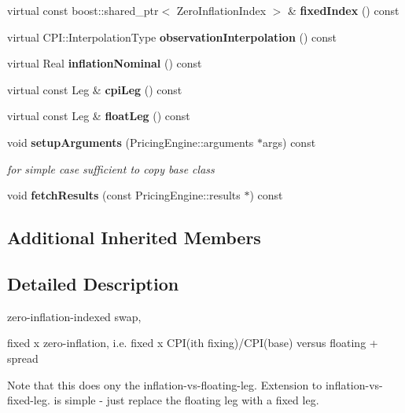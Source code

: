 \begin{DoxyCompactItemize}
\item 
virtual const boost\+::shared\+\_\+ptr$<$ Zero\+Inflation\+Index $>$ \& {\bfseries fixed\+Index} () const \label{class_quant_lib_1_1_c_p_i_swap_a18cbab644491d2a5b72d5044c98386e6}

\item 
virtual C\+P\+I\+::\+Interpolation\+Type {\bfseries observation\+Interpolation} () const \label{class_quant_lib_1_1_c_p_i_swap_afdc069ae77475b2dc6714b8dd766ec1b}

\item 
virtual Real {\bfseries inflation\+Nominal} () const \label{class_quant_lib_1_1_c_p_i_swap_ac9c3f4fbd8705c70612f2d0a5a535fa8}

\item 
virtual const Leg \& {\bfseries cpi\+Leg} () const \label{class_quant_lib_1_1_c_p_i_swap_a0bdee6997790a36874d6052082d7b796}

\item 
virtual const Leg \& {\bfseries float\+Leg} () const \label{class_quant_lib_1_1_c_p_i_swap_a16cc086eae31f64ecf520803409f9f1d}

\item 
void {\bf setup\+Arguments} (Pricing\+Engine\+::arguments $\ast$args) const \label{class_quant_lib_1_1_c_p_i_swap_aaa5a7cf39bd352dc53f197a0eb29cb4b}

\begin{DoxyCompactList}\small\item\em for simple case sufficient to copy base class \end{DoxyCompactList}\item 
void {\bfseries fetch\+Results} (const Pricing\+Engine\+::results $\ast$) const \label{class_quant_lib_1_1_c_p_i_swap_a2bf1f6b35df4b4ac8adc032755ed411a}

\end{DoxyCompactItemize}
\subsection*{Additional Inherited Members}


\subsection{Detailed Description}
zero-\/inflation-\/indexed swap, 

fixed x zero-\/inflation, i.\+e. fixed x C\+PI(i\textquotesingle{}th fixing)/\+C\+PI(base) versus floating + spread

Note that this does ony the inflation-\/vs-\/floating-\/leg. Extension to inflation-\/vs-\/fixed-\/leg. is simple -\/ just replace the floating leg with a fixed leg.

